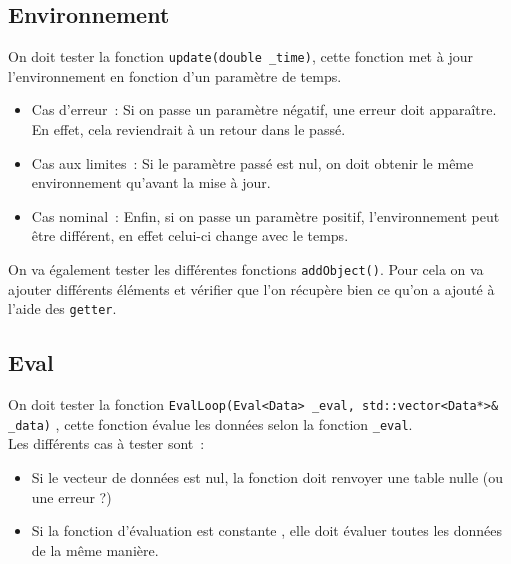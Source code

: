 

\subsection{Environnement}

On doit tester la fonction \texttt{update(double \_time)}, cette fonction met à jour l'environnement en fonction d'un paramètre de temps.\\

\begin{itemize}
\item Cas d'erreur~: Si on passe un paramètre négatif, une erreur doit apparaître. En effet, cela reviendrait à un retour dans le passé.
\item Cas aux limites~: Si le paramètre passé est nul, on doit obtenir le même environnement qu'avant la mise à jour.
\item Cas nominal~: Enfin, si on passe un paramètre positif, l'environnement peut être différent, en effet celui-ci change avec le temps.\\
\end{itemize}

On va également tester les différentes fonctions \texttt{addObject()}. Pour cela on va ajouter différents éléments et vérifier que l'on récupère bien ce qu'on a ajouté à l'aide des \texttt{getter}.\\

\subsection{Eval}

On doit tester la fonction \texttt{EvalLoop(Eval<Data> \_eval, std::vector<Data*>\& \_data)} , cette fonction évalue les données selon la fonction \texttt{\_eval}.\\

Les différents cas à tester sont~:
\begin{itemize}
\item Si le vecteur de données est nul, la fonction doit renvoyer une table nulle (ou une erreur ?)
\item Si la fonction d'évaluation est \og constante \fg, elle doit évaluer toutes les données de la même manière.
\end{itemize}


